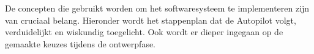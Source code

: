 \\
\\
\noindent
De concepten die gebruikt worden om het softwaresysteem te implementeren zijn van cruciaal belang. Hieronder wordt het stappenplan dat de Autopilot volgt, verduidelijkt en wiskundig toegelicht. Ook wordt er dieper ingegaan op de gemaakte keuzes tijdens de ontwerpfase. 


